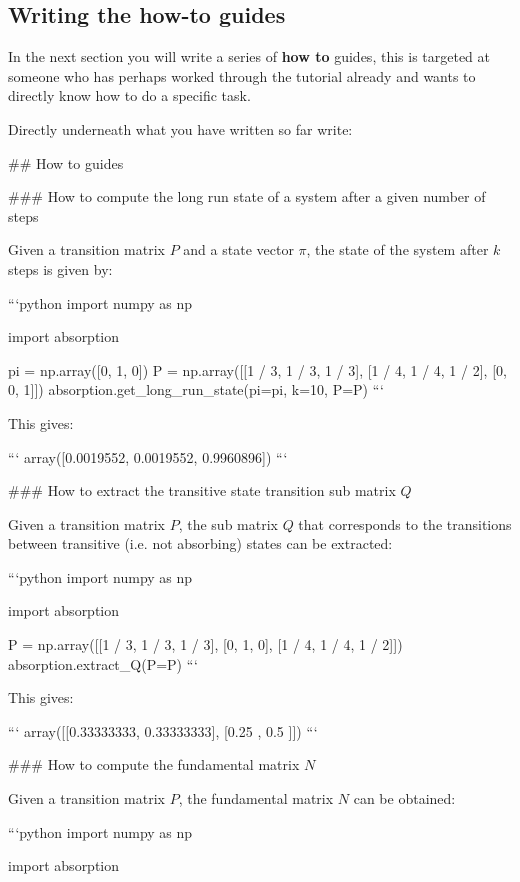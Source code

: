 \subsection{Writing the how-to guides}
\label{\detokenize{building-tools/06-documentation/tutorial/main:writing-the-how-to-guides}}

In the next section you will write a series of \textbf{how to} guides, this is
targeted
at someone who has perhaps worked through the tutorial already and wants to
directly know how to do a specific task.

Directly underneath what you have written so far write:

\begin{md}

## How to guides

### How to compute the long run state of a system after a given number of steps

Given a transition matrix $P$ and a state vector $\pi$, the state of the system
after $k$ steps is given by:

```python
import numpy as np

import absorption

pi = np.array([0, 1, 0])
P = np.array([[1 / 3, 1 / 3, 1 / 3], [1 / 4, 1 / 4, 1 / 2], [0, 0, 1]])
absorption.get_long_run_state(pi=pi, k=10, P=P)
```

This gives:

```
array([0.0019552, 0.0019552, 0.9960896])
```

### How to extract the transitive state transition sub matrix $Q$

Given a transition matrix $P$, the sub matrix $Q$ that
corresponds to the transitions between transitive (i.e. not absorbing) states can
be extracted:

```python
import numpy as np

import absorption

P = np.array([[1 / 3, 1 / 3, 1 / 3], [0, 1, 0], [1 / 4, 1 / 4, 1 / 2]])
absorption.extract_Q(P=P)
```

This gives:

```
array([[0.33333333, 0.33333333],
       [0.25      , 0.5       ]])
```

### How to compute the fundamental matrix $N$

Given a transition matrix $P$, the fundamental matrix $N$
can be obtained:

```python
import numpy as np

import absorption


\end{md}
